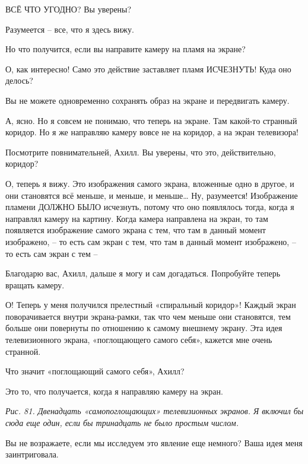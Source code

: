 \documentclass[../main.tex]{subfiles}
\begin{document}
\begin{dialogue}
 ВСЁ ЧТО УГОДНО? Вы уверены?

 Разумеется \--- все, что я здесь вижу.

 Но что получится, если вы направите камеру на пламя на экране?


 О, как интересно! Само это действие заставляет пламя ИСЧЕЗНУТЬ! Куда оно делось?

 Вы не можете одновременно сохранять образ на экране и передвигать камеру.

 А, ясно. Но я совсем не понимаю, что теперь на экране. Там какой-то странный коридор. Но я же направляю камеру вовсе не на коридор, а на экран телевизора!

 Посмотрите повнимательней, Ахилл. Вы уверены, что это, действительно, коридор?

 О, теперь я вижу. Это изображения самого экрана, вложенные одно в другое, и они становятся всё меньше, и меньше, и меньше\ldots{} Ну, разумеется! Изображение пламени ДОЛЖНО БЫЛО исчезнуть, потому что оно появлялось тогда, когда я направлял камеру на картину. Когда камера направлена на экран, то там появляется изображение самого экрана с тем, что там в данный момент изображено, \--- то есть сам экран с тем, что там в данный момент изображено, \--- то есть сам экран с тем \---

 Благодарю вас, Ахилл, дальше я могу и сам догадаться. Попробуйте теперь вращать камеру.

 О! Теперь у меня получился прелестный «спиральный коридор»! Каждый экран поворачивается внутри экрана-рамки, так что чем меньше они становятся, тем больше они повернуты по отношению к самому внешнему экрану. Эта идея телевизионного экрана, «поглощающего самого себя», кажется мне очень странной.

 Что значит «поглощающий самого себя», Ахилл?

 Это то, что получается, когда я направляю камеру на экран.

\emph{Рис. 81. Двенадцать «самопоглощающих» телевизионных экранов. Я включил бы сюда еще один, если бы тринадцать не было простым числом.}

 Вы не возражаете, если мы исследуем это явление еще немного? Ваша идея меня заинтриговала.


\end{dialogue}
\end{document}
